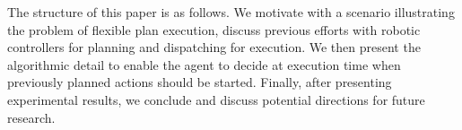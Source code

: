 The structure of this paper is as follows. We motivate with a
scenario illustrating the problem of flexible plan execution, discuss
previous efforts with robotic controllers for planning and dispatching
for execution. We then present the algorithmic detail to enable the
agent to decide at execution time when previously planned actions 
should be started. Finally, after presenting experimental results, 
we conclude and discuss potential directions for future research.

